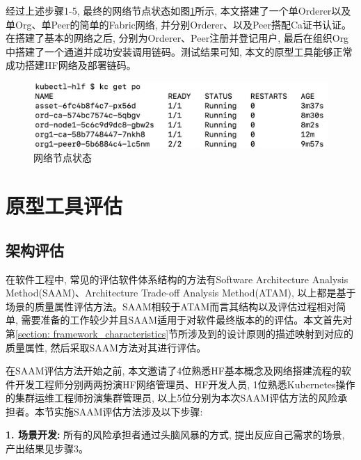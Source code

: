经过上述步骤1-5, 最终的网络节点状态如图\ref{fabric_result}所示, 本文搭建了一个单Orderer以及单Org、单Peer的简单的Fabric网络, 并分别Orderer、以及Peer搭配Ca证书认证。在搭建了基本的网络之后, 分别为Orderer、Peer注册并登记用户, 最后在组织Org中搭建了一个通道并成功安装调用链码。测试结果可知, 本文的原型工具能够正常成功搭建HF网络及部署链码。


\begin{figure}[h] %
    \centering %
    \includegraphics[width=1.0\textwidth]{FIGs/chapter5/fabric_result.png} %
    \caption{网络节点状态} %
    \label{fabric_result} %
\end{figure}%

\section{原型工具评估}

\subsection{架构评估}

在软件工程中, 常见的评估软件体系结构的方法有Software Architecture Analysis Method(SAAM)、Architecture Trade-off Analysis Method(ATAM), 以上都是基于场景的质量属性评估方法。SAAM相较于ATAM而言其结构以及评估过程相对简单, 需要准备的工作较少并且SAAM适用于对软件最终版本的的评估\cite{huhonglei2004}。本文首先对第\ref{section: framework_characteristics}节所涉及到的设计原则的描述映射到对应的质量属性, 然后采取SAAM方法对其进行评估。

在SAAM评估方法开始之前, 本文邀请了4位熟悉HF基本概念及网络搭建流程的软件开发工程师分别两两扮演HF网络管理员、HF开发人员, 1位熟悉Kubernetes操作的集群运维工程师扮演集群管理员, 以上5位分别为本次SAAM评估方法的风险承担者。本节实施SAAM评估方法涉及以下步骤:

\textbf{1. 场景开发: }所有的风险承担者通过头脑风暴的方式, 提出反应自己需求的场景, 产出结果见步骤3。

